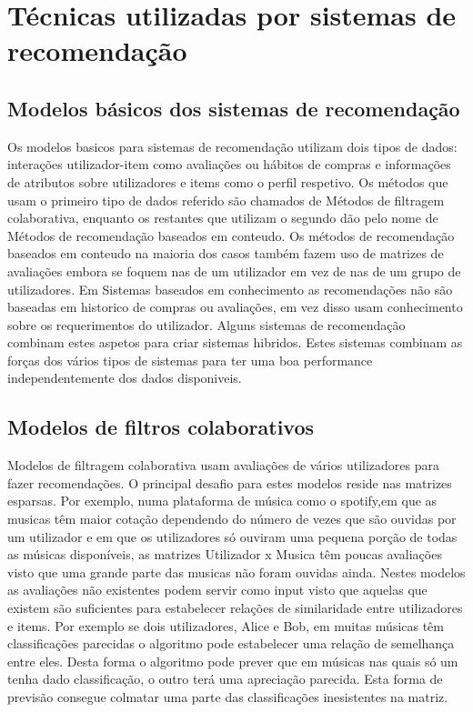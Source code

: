\section{Técnicas utilizadas por sistemas de recomendação}
\subsection{Modelos básicos dos sistemas de recomendação}

Os modelos basicos para sistemas de recomendação utilizam dois tipos de dados: interações utilizador-item como avaliações ou hábitos de compras e informações de atributos sobre utilizadores e items como o perfil respetivo.
Os métodos que usam o primeiro tipo de dados referido são chamados de Métodos de filtragem colaborativa, enquanto os restantes que utilizam o segundo dão pelo nome de Métodos de recomendação baseados em conteudo.
Os métodos de recomendação baseados em conteudo na maioria dos casos também fazem uso de matrizes de avaliações embora se foquem nas de um utilizador em vez de nas de um grupo de utilizadores.
Em Sistemas baseados em conhecimento as recomendações não são baseadas em historico de compras ou avaliações, em vez disso usam conhecimento sobre os requerimentos do utilizador.
 Alguns sistemas de recomendação combinam estes aspetos para criar sistemas hibridos. Estes sistemas combinam as forças dos vários tipos de sistemas para ter uma boa performance independentemente dos dados disponiveis.


\subsection{Modelos de filtros colaborativos}


Modelos de filtragem colaborativa usam avaliações de vários utilizadores para fazer recomendações.
O principal desafio para estes modelos reside nas matrizes esparsas.
Por exemplo, numa plataforma de música como o spotify,em que as musicas têm maior cotação dependendo do número de vezes que são ouvidas por um utilizador e em que os utilizadores só ouviram uma pequena porção de todas as músicas disponíveis, as matrizes Utilizador x Musica têm poucas avaliações visto que uma grande parte das musicas não foram ouvidas ainda.
Nestes modelos as avaliações não existentes podem servir como input visto que aquelas que existem são suficientes para estabelecer relações de similaridade entre utilizadores e items.
Por exemplo se dois utilizadores, Alice e Bob, em muitas músicas têm classificações parecidas o algoritmo pode estabelecer uma relação de semelhança entre eles. Desta forma o algoritmo pode prever que em músicas nas quais só um tenha dado classificação, o outro terá uma apreciação parecida. Esta forma de previsão consegue colmatar uma parte das classificações inesistentes na matriz.

